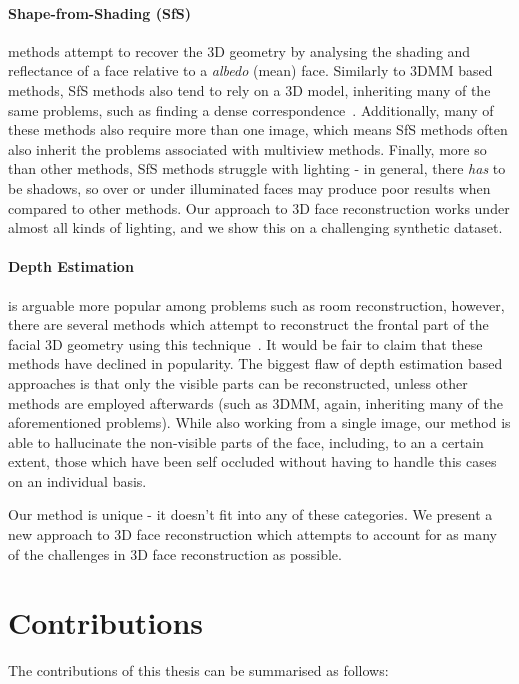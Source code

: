 \paragraph{Shape-from-Shading (SfS)} methods attempt to recover the 3D
geometry by analysing the shading and reflectance of a face relative
to a \textit{albedo} (mean) face. Similarly to 3DMM based methods, SfS
methods also tend to rely on a 3D model, inheriting many of the same
problems, such as finding a dense
correspondence~\cite{suwajanakorn2014total,jiang20183d}. Additionally,
many of these methods also require more than one image, which means
SfS methods often also inherit the problems associated with multiview
methods. Finally, more so than other methods, SfS methods struggle
with lighting - in general, there \textit{has} to be shadows, so over
or under illuminated faces may produce poor results when compared to
other methods. Our approach to 3D face reconstruction works under
almost all kinds of lighting, and we show this on a challenging
synthetic dataset.

\paragraph{Depth Estimation} is arguable more popular among problems
such as room reconstruction, however, there are several methods which
attempt to reconstruct the frontal part of the facial 3D geometry
using this technique~\cite{sun2011depth,sun2013depth}. It would be
fair to claim that these methods have declined in popularity. The
biggest flaw of depth estimation based approaches is that only the
visible parts can be reconstructed, unless other methods are employed
afterwards (such as 3DMM, again, inheriting many of the aforementioned
problems). While also working from a single image, our method is able
to hallucinate the non-visible parts of the face, including, to an a
certain extent, those which have been self occluded without having to
handle this cases on an individual basis.

Our method is unique - it doesn't fit into any of these categories. We
present a new approach to 3D face reconstruction which attempts to
account for as many of the challenges in 3D face reconstruction as
possible.

\section{Contributions}

The contributions of this thesis can be summarised as follows:

